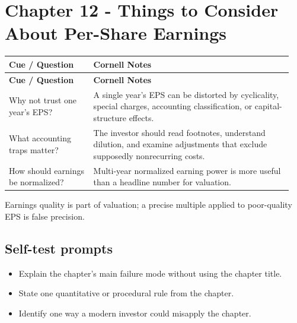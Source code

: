 \documentclass[11pt]{article}
\begin{document}
\section{Chapter 12 - Things to Consider About Per-Share Earnings}
\begin{longtable}{@{}>{\raggedright\arraybackslash}p{0.29\linewidth}>{\raggedright\arraybackslash}p{0.66\linewidth}@{}}\toprule\textbf{Cue / Question} & \textbf{Cornell Notes}\\\midrule\endfirsthead\toprule\textbf{Cue / Question} & \textbf{Cornell Notes}\\\midrule\endhead
Why not trust one year's EPS? & A single year's EPS can be distorted by cyclicality, special charges, accounting classification, or capital-structure effects. \\
What accounting traps matter? & The investor should read footnotes, understand dilution, and examine adjustments that exclude supposedly nonrecurring costs. \\
How should earnings be normalized? & Multi-year normalized earning power is more useful than a headline number for valuation. \\
\bottomrule\end{longtable}
\begin{principlebox}Earnings quality is part of valuation; a precise multiple applied to poor-quality EPS is false precision.\end{principlebox}
\subsection*{Self-test prompts}\begin{itemize}\item Explain the chapter's main failure mode without using the chapter title.\item State one quantitative or procedural rule from the chapter.\item Identify one way a modern investor could misapply the chapter.\end{itemize}
\end{document}
